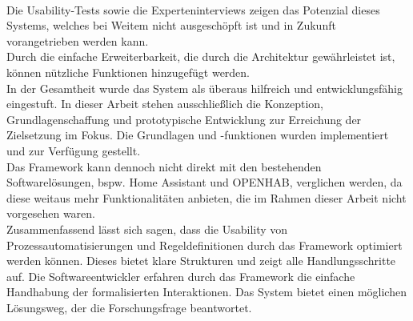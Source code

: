     \\
    \linebreak
    Die Usability-Tests sowie die Experteninterviews zeigen das Potenzial dieses Systems, welches bei Weitem nicht ausgeschöpft ist 
    und in Zukunft vorangetrieben werden kann. 
    \\
    \linebreak
    Durch die einfache Erweiterbarkeit, die durch die Architektur gewährleistet ist, können nützliche Funktionen hinzugefügt 
    werden. 
    \\
    In der Gesamtheit wurde das System als überaus hilfreich und entwicklungsfähig eingestuft. In dieser Arbeit stehen ausschließlich die 
    Konzeption, Grundlagenschaffung und prototypische Entwicklung zur Erreichung der Zielsetzung im Fokus. Die Grundlagen und -funktionen 
    wurden implementiert und zur Verfügung gestellt.
    \\
    \linebreak
    Das Framework kann dennoch nicht direkt mit den bestehenden Softwarelösungen, bspw. Home Assistant und \acs{OPENHAB}, verglichen 
    werden, da diese weitaus mehr Funktionalitäten anbieten, die im Rahmen dieser Arbeit nicht vorgesehen waren. 
    \\
    \linebreak
    Zusammenfassend lässt sich sagen, dass die Usability von Prozessautomatisierungen und Regeldefinitionen durch das Framework 
    optimiert werden können. Dieses bietet klare Strukturen und zeigt alle Handlungsschritte auf. Die Softwareentwickler erfahren 
    durch das Framework die einfache Handhabung der formalisierten Interaktionen. Das System bietet einen möglichen Lösungsweg, 
    der die Forschungsfrage beantwortet. 